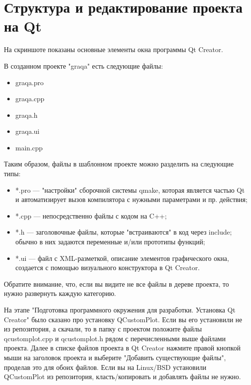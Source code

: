 \section{Структура и редактирование проекта на Qt}

На скриншоте показаны основные элементы окна программы Qt Creator.

В созданном проекте "graqa" есть следующие файлы:

\begin{itemize}
  \item graqa.pro
  \item graqa.cpp
  \item graqa.h
  \item graqa.ui
  \item main.cpp
\end{itemize}

Таким образом, файлы в шаблонном проекте можно разделить на следующие типы:

\begin{itemize}
  \item *.pro — "настройки" сборочной системы qmake, которая является частью Qt и автоматизирует вызов компилятора с нужными параметрами и пр. действия;
  \item *.cpp — непосредственно файлы с кодом на C++;
  \item *.h — заголовочные файлы, которые "встраиваются" в код через include; обычно в них задаются переменные и/или прототипы функций;
  \item *.ui — файл с XML-разметкой, описание элементов графического окна, создается с помощью визуального конструктора в Qt Creator.
\end{itemize}

Обратите внимание, что, если вы видите не все файлы в дереве проекта, то нужно развернуть каждую категорию.

На этапе "Подготовка программного окружения для разработки. Установка Qt Creator" было сказано про установку QCustomPlot. Если вы его установили не из репозитория, а скачали, то в папку с проектом положите файлы qcustomplot.cpp и qcustomplot.h рядом с перечисленными выше файлами проекта. Далее в списке файлов проекта в Qt Creator нажмите правой кнопкой мыши на заголовок проекта и выберите "Добавить существующие файлы", проделав это для обоих файлов. Если вы на Linux/BSD установили QCustomPlot из репозитория, класть/копировать и добавлять файлы не нужно.

